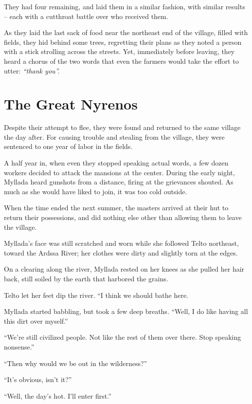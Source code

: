 They had four remaining, and laid them in a similar fashion, with similar results -- each with a cutthroat battle over who received them.

As they laid the last sack of food near the northeast end of the village, filled with fields, they hid behind some trees, regretting their plans as they noted a person with a stick strolling across the streets. Yet, immediately before leaving, they heard a chorus of the two words that even the farmers would take the effort to utter: \emph{``thank you''.}

\chapter{The Great Nyrenos}

Despite their attempt to flee, they were found and returned to the same village the day after. For causing trouble and stealing from the village, they were sentenced to one year of labor in the fields.

A half year in, when even they stopped speaking actual words, a few dozen workers decided to attack the mansions at the center. During the early night, Myllada heard gunshots from a distance, firing at the grievances shouted. As much as she would have liked to join, it was too cold outside.

When the time ended the next summer, the masters arrived at their hut to return their possessions, and did nothing else other than allowing them to leave the village.

\centeredstars

Myllada's face was still scratched and worn while she followed Telto northeast, toward the Ardssa River; her clothes were dirty and slightly torn at the edges.

On a clearing along the river, Myllada rested on her knees as she pulled her hair back, still soiled by the earth that harbored the grains.

Telto let her feet dip the river. ``I think we should bathe here.

Myllada started babbling, but took a few deep breaths. ``Well, I do like having all this dirt over myself.''

``We're still civilized people. Not like the rest of them over there. Stop speaking nonsense.''

``Then why would we be out in the wilderness?''

``It's obvious, isn't it?''

``Well, the day's hot. I'll enter first.''

